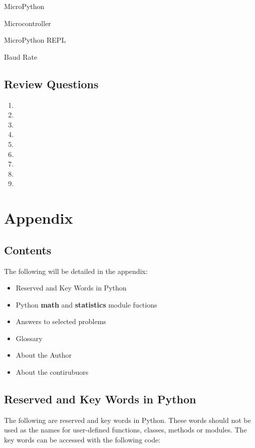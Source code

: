 \documentclass{book}
\begin{document}
    MicroPython

Microcontroller

MicroPython REPL

Baud Rate

    \section{Review Questions}\label{review-questions}

    \begin{enumerate}
\def\labelenumi{\arabic{enumi}.}
\item
\item
\item
\item
\item
\item
\item
\item
\item
\end{enumerate}

    \chapter{Appendix}\label{appendix}

    \section{Contents}\label{contents}

    The following will be detailed in the appendix:

\begin{itemize}
\item
  Reserved and Key Words in Python
\item
  Python \textbf{math} and \textbf{statistics} module fuctions
\item
  Answers to selected problems
\item
  Glossary
\item
  About the Author
\item
  About the contirubuors
\end{itemize}

    \section{Reserved and Key Words in
Python}\label{reserved-and-key-words-in-python}

    The following are reserved and key words in Python. These words should
not be used as the names for user-defined functions, classes, methods or
modules. The key words can be accessed with the following code:
\end{document}
